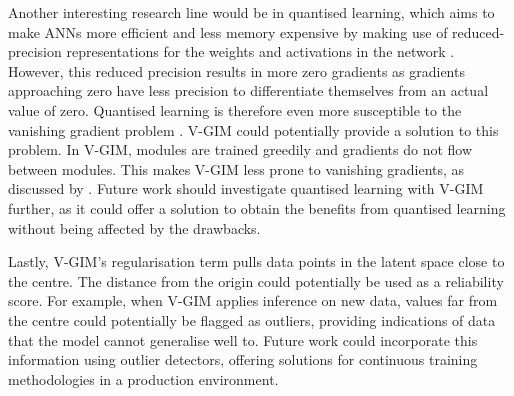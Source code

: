 		Another interesting research line would be in quantised learning, which aims to make ANNs more efficient and less memory expensive by making use of reduced-precision representations for the weights and activations in the network \cite{blottFINNREndtoEndDeepLearning2018}. However, this reduced precision results in more zero gradients as gradients approaching zero have less precision to differentiate themselves from an actual value of zero. Quantised learning is therefore even more susceptible to the vanishing gradient problem \cite{kimDistanceawareQuantization2021}. V-GIM could potentially provide a solution to this problem. In V-GIM, modules are trained greedily and gradients do not flow between modules. This makes V-GIM less prone to vanishing gradients, as discussed by \cite{lowePuttingEndEndtoEnd2020}. Future work should investigate quantised learning with V-GIM further, as it could offer a solution to obtain the benefits from quantised learning without being affected by the drawbacks.
		
		
		Lastly, V-GIM's regularisation term pulls data points in the latent space close to the centre. The distance from the origin could potentially be used as a reliability score. For example, when V-GIM applies inference on new data, values far from the centre could potentially be flagged as outliers, providing indications of data that the model cannot generalise well to. Future work could incorporate this information using outlier detectors, offering solutions for continuous training methodologies in a production environment.
		


		
		
		
		

		
		
